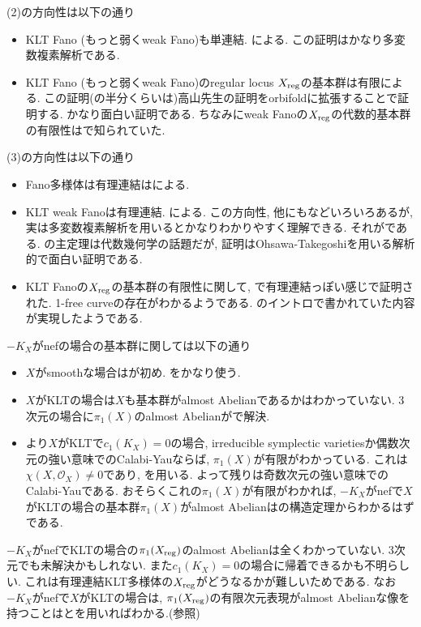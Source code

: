 \documentclass[dvipdfmx,a4paper,11pt]{article} %
\theoremstyle{definition}
\theoremstyle{remark}
\numberwithin{equation}{section}
\newcommand{\reg}{{\rm{reg}}}
\begin{document}
(2)の方向性は以下の通り
\begin{itemize}
\item KLT Fano (もっと弱くweak Fano)も単連結. \cite{Tak00}による. この証明はかなり多変数複素解析である.
\item KLT Fano (もっと弱くweak Fano)のregular locus $X_\reg$の基本群は有限\cite{Bra21}による. この証明(の半分くらいは)高山先生の証明をorbifoldに拡張することで証明する. かなり面白い証明である. ちなみにweak Fanoの$X_{\reg}$の代数的基本群の有限性は\cite{Xu14}で知られていた. 
\end{itemize}
(3)の方向性は以下の通り
\begin{itemize}
\item Fano多様体は有理連結は\cite{Cam92, KMM92}による. 
\item KLT weak Fanoは有理連結. \cite{Zhang04}による. この方向性, 他にも\cite{BP11, EG19, CCM21, EIM21}などいろいろあるが, 実は多変数複素解析を用いるとかなりわかりやすく理解できる. それが\cite{Deng21}である. \cite{Deng21}の主定理は代数幾何学の話題だが, 証明はOhsawa-Takegoshiを用いる解析的で面白い証明である. 
\item KLT Fanoの$X_\reg$の基本群の有限性に関して, \cite{JLR25}で有理連結っぽい感じで証明された. 1-free curveの存在がわかるようである. \cite{Bra21}のイントロで書かれていた内容が実現したようである. 
\end{itemize}

$-K_X$がnefの場合の基本群に関しては以下の通り 
\begin{itemize}
\item $X$がsmoothな場合は\cite{Paun98}が初め. \cite{DPS96}をかなり使う. 
\item $X$がKLTの場合は$X$も基本群がalmost Abelianであるかはわかっていない. 3次元の場合に$\pi_{1}(X)$のalmost Abelianが\cite{FGSW26}で解決. 
\item \cite{GGK19, Cam21}より$X$がKLTで$c_1(K_X)=0$の場合,  irreducible symplectic varietiesか偶数次元の強い意味でのCalabi-Yauならば, $\pi_1(X)$が有限がわかっている. 
これは$\chi(X, \mathcal{O}_X) \neq 0$であり, \cite{Cam95}を用いる. よって残りは奇数次元の強い意味でのCalabi-Yauである. おそらくこれの$\pi_1(X)$が有限がわかれば, $-K_X$がnefで$X$がKLTの場合の基本群$\pi_1(X)$がalmost Abelianは\cite{MW21}の構造定理からわかるはずである. 
\end{itemize}

$-K_X$がnefでKLTの場合の$\pi_1(X_\reg)$のalmost Abelianは全くわかっていない. 3次元でも未解決かもしれない. また$c_1(K_X)=0$の場合に帰着できるかも不明らしい. これは有理連結KLT多様体の$X_\reg$がどうなるかが難しいためである. なお$-K_X$がnefで$X$がKLTの場合は, $\pi_1(X_\reg)$の有限次元表現がalmost Abelianな像を持つことは\cite{GGK19}と\cite{MW21}を用いればわかる.(\cite{IMM24}参照)  

\newpage




\end{document}
